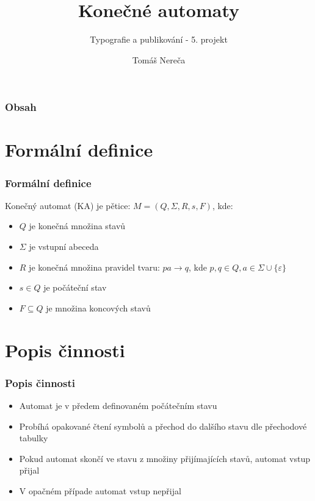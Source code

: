 \documentclass[11pt,hyperref={unicode}]{beamer}
\title{Konečné automaty}
\subtitle{Typografie a publikování - 5. projekt}
\author{Tomáš Nereča}
\institute{Vysoké učení technické v~Brně\\
	Fakulta informačních technologií}
\begin{document}
	\begin{frame}
		\titlepage
	\end{frame}
	
	\begin{frame}
		\frametitle{Obsah}
		\tableofcontents
	\end{frame}

	\section{Formální definice}
	\begin{frame}
		\frametitle{Formální definice}
		Konečný automat (KA) je pětice:
		$M = (Q, \Sigma, R, s, F)$, kde:
		\begin{itemize}
			\item $Q$ je konečná množina stavů
			\item $\Sigma$ je vstupní abeceda
			\item $R$ je konečná množina pravidel tvaru: $pa\rightarrow q$,
			kde $p, q \in Q, a \in \Sigma \cup \{\varepsilon\}$
			\item $s \in Q$ je počáteční stav
			\item $F \subseteq Q$ je množina koncových stavů
		\end{itemize}
	\end{frame}

	\section{Popis činnosti}
	\begin{frame}
		\frametitle{Popis činnosti}
		\begin{itemize}
			\item Automat je v předem definovaném počátečním stavu
			\item Probíhá opakované čtení symbolů a přechod do dalšího stavu dle přechodové tabulky
			\item Pokud automat skončí ve stavu z množiny přijímajících stavů, automat vstup přijal
			\item V opačném případe automat vstup nepřijal
		\end{itemize}
	\end{frame}
\end{document}
